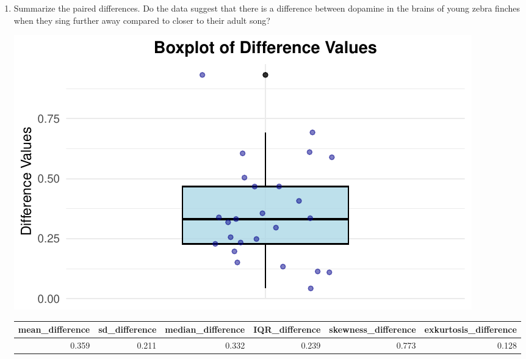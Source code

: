 \documentclass{article}\usepackage[]{graphicx}\usepackage[]{xcolor}
\makeatletter
\def\maxwidth{ %
  \ifdim\Gin@nat@width>\linewidth
    \linewidth
  \else
    \Gin@nat@width
  \fi
}
\newenvironment{knitrout}{}{} %
\makeatother
\begin{document}
\begin{enumerate}
\begin{enumerate}
  \item Summarize the paired differences. Do the data suggest
  that there is a difference between dopamine in the brains of
  young zebra finches when they sing further away compared to 
  closer to their adult song?
\begin{knitrout}
\color{fgcolor}

{\centering \includegraphics[width=\maxwidth]{figure/unnamed-chunk-7-1} 

}


\end{knitrout}
\begin{table}[ht]
\centering
\begin{tabular}{rrrrrr}
  \hline
mean\_difference & sd\_difference & median\_difference & IQR\_difference & skewness\_difference & exkurtosis\_difference \\ 
  \hline
0.359 & 0.211 & 0.332 & 0.239 & 0.773 & 0.128 \\ 
   \hline
\end{tabular}
\end{table}


\end{enumerate}
\end{enumerate}
\end{document}
